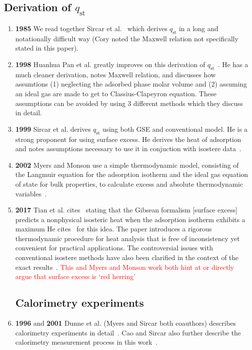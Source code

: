 \documentclass[letterpaper,twocolumn,amsmath,amssymb,jcp,aps,10pt]{revtex4-1}
\begin{document}
\subsection{Derivation of $q_\text{st}$}
\begin{enumerate}
\item {\textbf{1985}} We read together Sircar et al.~\cite{sircar1985excess} which derives $q_\text{st}$ in a long and notationally difficult way (Cory noted the Maxwell relation not specifically stated in this paper).

\item {\textbf{1998}} Huanhua Pan et al. greatly improves on this derivation of $q_\text{st}$~\cite{pan1998examination}. He has a much cleaner derivation, notes Maxwell relation, and discusses how assumtions (1) neglecting the adsorbed phase molar volume and (2) assuming an ideal gas are made to get to Classius-Clapeyron equation. These assumptions can be avoided by using 3 different methods which they discuss in detail.

\item {\textbf{1999}} Sircar et al. derives $q_\text{st}$ using both GSE and conventional model. He is a strong proponent for using surface excess. He derives the heat of adsorption and notes assumptions necessary to use it in conjuction with isostere data~\cite{sircar1999isosteric}.

\item {\textbf{2002}} Myers and Monson use a simple thermodynamic model, consisting of the Langmuir equation for the adsorption isotherm and the ideal gas equation of state for bulk properties, to calculate excess and absolute thermodynamic variables~\cite{myers2002adsorption}.

\item {\textbf{2017}} Tian et al. cites~\cite{pan1998examination} stating that the Gibsean formalism [surface excess] predicts a nonphysical isosteric heat when the adsorption isotherm exhibits a maximum He cites~\cite{myers2014physical} for this idea. The paper introduces a rigorous thermodynamic procedure for heat analysis that is free of inconsistency yet convenient for practical applications. The controversial issues with conventional isostere methods have also been clarified in the context of the exact results~\cite{tian2017differential}.
\textcolor{red}{This and Myers and Monson work both hint at or directly argue that surface excess is `red herring'}
\subsection{Calorimetry experiments}
\item {\textbf{1996} and \textbf{2001}} Dunne et al. (Myers and Sircar both coauthors) describes calorimetry experiments in detail~\cite{dunne1996calorimetric}. Cao and Sircar also further describe the calorimetry measurement process in this work~\cite{cao2001heats}.


\end{enumerate}
\end{document}
